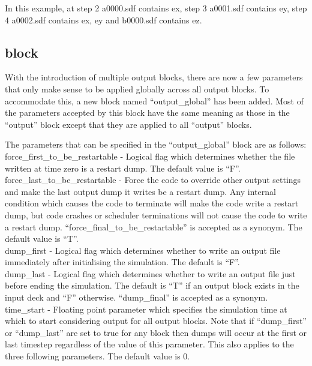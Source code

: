 In this example, at step 2 a0000.sdf contains ex, step 3 a0001.sdf
contains ey, step 4 a0002.sdf contains ex, ey and b0000.sdf
contains ez.


\subsection{\texorpdfstring
  { block}
  {           {output\_global} block}}
\label{sec:output_global_block}

With the introduction of multiple output blocks, there are now a few parameters
that only make sense to be applied globally across all output blocks. To
accommodate this, a new block named ``output\_global'' has been added.
Most of the parameters accepted by this block have the same meaning as those
in the ``output'' block except that they are applied to all ``output'' blocks.

The parameters that can be specified in the ``output\_global'' block are
as follows:\\

{\emphtext force\_first\_to\_be\_restartable} - Logical flag which determines
  whether the file written at time zero is a restart dump. The default value
  is ``F''.\\

{\emphtext force\_last\_to\_be\_restartable} - Force the code to override
other output settings and make the last output dump it writes be a restart
dump. Any internal condition which causes the code to terminate will make the
code write a restart dump, but code crashes or scheduler terminations will not
cause the code to write a restart dump.
``force\_final\_to\_be\_restartable'' is accepted as a synonym.
The default value is ``T''.\\

{\emphtext dump\_first} - Logical flag which determines whether to write an
  output file immediately after initialising the simulation. The default is
  ``F''.\\

{\emphtext dump\_last} - Logical flag which determines whether to write an
  output file just before ending the simulation. The default is ``T'' if
  an output block exists in the input deck and ``F'' otherwise.
  ``dump\_final'' is accepted as a synonym.\\

{\emphtext time\_start} - Floating point parameter which specifies the
  simulation time at which to start considering output for all output
  blocks. Note
  that if ``dump\_first'' or ``dump\_last'' are set to true for any block then
  dumps will occur at the first or last timestep regardless of the value of this
  parameter. This also applies to the three following parameters.
  The default value is 0.\\

